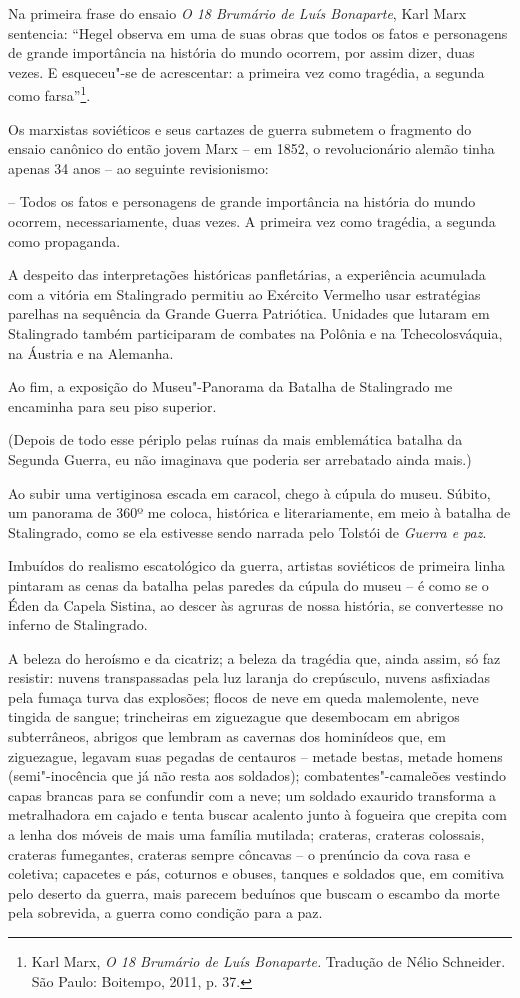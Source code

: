 Na primeira frase do ensaio \emph{O 18 Brumário de Luís Bonaparte}, Karl
Marx sentencia: ``Hegel observa em uma de suas obras que todos os fatos
e personagens de grande importância na história do mundo ocorrem, por
assim dizer, duas vezes. E esqueceu"-se de acrescentar: a primeira vez
como tragédia, a segunda como farsa''\footnote{Karl Marx, \emph{O 18
  Brumário de Luís Bonaparte.} Tradução de Nélio Schneider. São Paulo:
  Boitempo, 2011, p. 37.}.

Os marxistas soviéticos e seus cartazes de guerra submetem o fragmento
do ensaio canônico do então jovem Marx -- em 1852, o revolucionário
alemão tinha apenas 34 anos -- ao seguinte revisionismo:

-- Todos os fatos e personagens de grande importância na história do
mundo ocorrem, necessariamente, duas vezes. A primeira vez como
tragédia, a segunda como propaganda.

A despeito das interpretações históricas panfletárias, a experiência
acumulada com a vitória em Stalingrado permitiu ao Exército Vermelho
usar estratégias parelhas na sequência da Grande Guerra Patriótica.
Unidades que lutaram em Stalingrado também participaram de combates na
Polônia e na Tchecolosváquia, na Áustria e na Alemanha.

Ao fim, a exposição do Museu"-Panorama da Batalha de Stalingrado me
encaminha para seu piso superior.

(Depois de todo esse périplo pelas ruínas da mais emblemática batalha da
Segunda Guerra, eu não imaginava que poderia ser arrebatado ainda mais.)

Ao subir uma vertiginosa escada em caracol, chego à cúpula do museu.
Súbito, um panorama de 360º me coloca, histórica e literariamente, em
meio à batalha de Stalingrado, como se ela estivesse sendo narrada pelo
Tolstói de \emph{Guerra e paz}.

Imbuídos do realismo escatológico da guerra, artistas soviéticos de
primeira linha pintaram as cenas da batalha pelas paredes da cúpula do
museu -- é como se o Éden da Capela Sistina, ao descer às agruras de
nossa história, se convertesse no inferno de Stalingrado.

A beleza do heroísmo e da cicatriz; a beleza da tragédia que, ainda
assim, só faz resistir: nuvens transpassadas pela luz laranja do
crepúsculo, nuvens asfixiadas pela fumaça turva das explosões; flocos de
neve em queda malemolente, neve tingida de sangue; trincheiras em
ziguezague que desembocam em abrigos subterrâneos, abrigos que lembram
as cavernas dos hominídeos que, em ziguezague, legavam suas pegadas de
centauros -- metade bestas, metade homens (semi"-inocência que já não
resta aos soldados); combatentes"-camaleões vestindo capas brancas para
se confundir com a neve; um soldado exaurido transforma a metralhadora
em cajado e tenta buscar acalento junto à fogueira que crepita com a
lenha dos móveis de mais uma família mutilada; crateras, crateras
colossais, crateras fumegantes, crateras sempre côncavas -- o prenúncio
da cova rasa e coletiva; capacetes e pás, coturnos e obuses, tanques e
soldados que, em comitiva pelo deserto da guerra, mais parecem beduínos
que buscam o escambo da morte pela sobrevida, a guerra como condição
para a paz.


